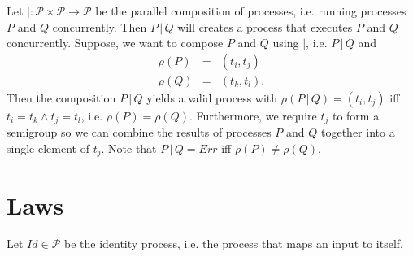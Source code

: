Let $| \colon \mathcal{P} \times \mathcal{P} \to \mathcal{P}$ be the parallel composition of processes, i.e. running processes $P$ and $Q$ concurrently. Then $P \,|\, Q$ will creates a process that executes $P$ and $Q$ concurrently. Suppose, we want to compose $P$ and $Q$ using $|$, i.e. $P \,|\, Q$ and
\begin{eqnarray*}
  \rho \left( P \right) & = & \left( t_i, t_j \right) \\
  \rho \left( Q \right) & = & \left( t_k, t_l \right).
\end{eqnarray*}
Then the composition $P \,|\, Q$ yields a valid process with $\rho \left( P \,|\, Q \right) = \left( t_i, t_j \right)$ iff $t_i = t_k \wedge t_j = t_l$, i.e. $\rho \left( P \right) = \rho \left( Q \right)$. Furthermore, we require $t_j$ to form a semigroup so we can combine the results of processes $P$ and $Q$ together into a single element of $t_j$. Note that $P \,|\, Q = Err$ iff $\rho \left( P \right) \neq \rho \left( Q \right)$.

\section{Laws}
Let $Id \in \mathcal{P}$ be the identity process, i.e. the process that maps an input to itself.